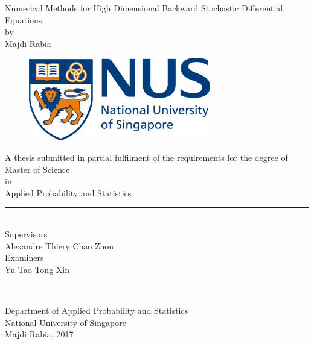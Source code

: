 \documentclass[english,11pt,openany]{report}
\theoremstyle{definition}
\theoremstyle{plain}
\theoremstyle{definition}
\begin{document}
	
	
	\thispagestyle{empty}
	\begin{center}
		\Large Numerical Methods for High Dimensional Backward Stochastic Differential Equations \\
		\vspace{0.5\baselineskip}
		by \\
		\vspace{0.5\baselineskip}
		Majdi Rabia \\
		\begin{figure}[H]
			\centering
		\includegraphics[scale = 0.6]{logo.png}
		\end{figure}
		A thesis submitted in partial fulfilment of the requirements for the degree of \\
		\vspace{0.5\baselineskip}
		Master of Science  \\ 
		\vspace{0.5\baselineskip}
		in \\ 
		\vspace{0.5\baselineskip}
		Applied Probability and Statistics \\
		\vspace{0.5cm}
		\rule{.2\textwidth}{.5pt}\\
		Supervisors\\
		\Large  Alexandre Thiery \hfill Chao Zhou \\
		
		Examiners\\
		\Large  Yu Tao \hfill Tong Xin  \\
		\rule{.2\textwidth}{.5pt}\\
		Department of Applied Probability and Statistics \\
		\vspace{0.5\baselineskip}
		National University of Singapore \\
		\: \textcopyright  Majdi Rabia, 2017
	\end{center}
\end{document}
